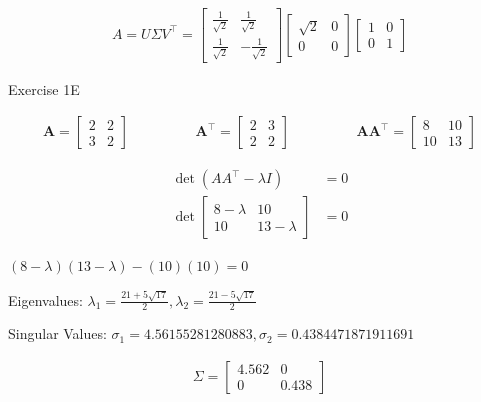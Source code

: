 \documentclass[11pt,letterpaper]{article}
\begin{document}
\begin{enumerate}
\begin{align*}
A = U \Sigma V^\top
= \begin{bmatrix}
        \frac{1}{\sqrt{2}} & \frac{1}{\sqrt{2}} \\
        \frac{1}{\sqrt{2}} & -\frac{1}{\sqrt{2}}
    \end{bmatrix}
    \begin{bmatrix}
        \sqrt{2} & 0 \\
        0 & 0
    \end{bmatrix}
    \begin{bmatrix}
        1 & 0 \\
        0 & 1
    \end{bmatrix}
\end{align*}

\noindent\dotfill Exercise 1E \noindent\dotfill

\begin{align*}
    \mathbf{A} 
    = \begin{bmatrix}
        2 & 2 \\
        3 & 2
    \end{bmatrix}
    \hspace{2cm}
    \mathbf{A^\top} 
    = \begin{bmatrix}
        2 & 3 \\
        2 & 2
    \end{bmatrix}
    \hspace{2cm}
    \mathbf{A A^\top} 
    = \begin{bmatrix}
        8 & 10 \\
        10 & 13
    \end{bmatrix}
\end{align*}

\begin{align*}
\det{(AA^\top - \lambda I)} &= 0 \\
\det{\begin{bmatrix}
        8-\lambda & 10 \\
        10 & 13-\lambda
    \end{bmatrix}} &= 0
\end{align*}

\( (8 - \lambda)(13 - \lambda)-(10)(10) = 0 \)

Eigenvalues: \( \lambda_1 = \frac{21+5\sqrt{17}}{2}, \lambda_2 = \frac{21-5\sqrt{17}}{2} \)

Singular Values: \( \sigma_1 = 4.56155281280883, \sigma_2 = 0.4384471871911691 \)

\begin{align*}
\Sigma = {\begin{bmatrix}
        4.562 & 0 \\
        0 & 0.438
    \end{bmatrix}}
\end{align*}


\end{enumerate}
\end{document}
